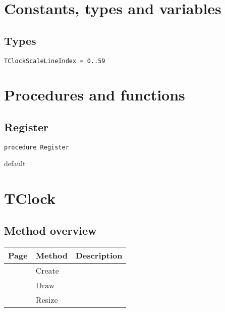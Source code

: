 \section{Constants, types and variables}
\label{retroclockconststypesvars}
\subsection{Types}
\label{retroclocktypes}

\begin{verbatim}
TClockScaleLineIndex = 0..59
\end{verbatim}
\label{hmi:retroclock:tclockscalelineindex}


\section{Procedures and functions}
\label{retroclockfunctions}
\subsection{Register}
\label{hmi:retroclock:register}
\begin{FPCList}
\Declaration 

\begin{verbatim}
procedure Register
\end{verbatim}
\Visibility
default
\end{FPCList}
\section{TClock}
\label{hmi:retroclock:tclock}
\subsection{Method overview}
\label{hmi:retroclock:tclock:methods}
\begin{tabularx}{\textwidth}{llX}
Page & Method & Description  \\ \hline
\pageref{hmi:retroclock:tclock:create} & Create  &  \\
\pageref{hmi:retroclock:tclock:draw} & Draw  &  \\
\pageref{hmi:retroclock:tclock:resize} & Resize  &  \\
\hline
\end{tabularx}
